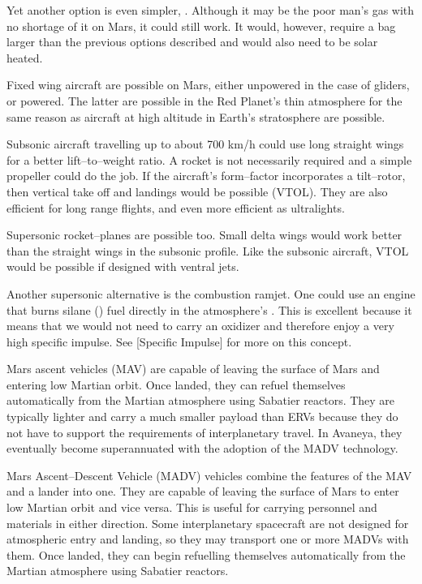 Yet another option is even simpler, . Although it may be the poor man's gas with no shortage of it on Mars, it could still work. It would, however, require a bag larger than the previous options described and would also need to be solar heated.

Fixed wing aircraft are possible on Mars, either unpowered in the case of gliders, or powered. The latter are possible in the Red Planet's thin atmosphere for the same reason as aircraft at high altitude in Earth's stratosphere are possible.

Subsonic aircraft travelling up to about 700 km/h could use long straight wings for a better lift--to--weight ratio. A rocket is not necessarily required and a simple propeller could do the job. If the aircraft's form--factor incorporates a tilt--rotor, then vertical take off and landings would be possible (VTOL). They are also efficient for long range flights, and even more efficient as ultralights.

Supersonic rocket--planes are possible too. Small delta wings would work better than the straight wings in the subsonic profile. Like the subsonic aircraft, VTOL would be possible if designed with ventral jets.

Another supersonic alternative is the combustion ramjet. One could use an engine that burns silane () fuel directly in the atmosphere's . This is excellent because it means that we would not need to carry an oxidizer and therefore enjoy a very high specific impulse. See [Specific Impulse] for more on this concept.

Mars ascent vehicles (MAV) are capable of leaving the surface of Mars and entering low Martian orbit. Once landed, they can refuel themselves automatically from the Martian atmosphere using Sabatier reactors. They are typically lighter and carry a much smaller payload than ERVs because they do not have to support the requirements of interplanetary travel. In Avaneya, they eventually become superannuated with the adoption of the MADV technology.

Mars Ascent--Descent Vehicle (MADV) vehicles combine the features of the MAV and a lander into one. They are capable of leaving the surface of Mars to enter low Martian orbit and vice versa. This is useful for carrying personnel and materials in either direction. Some interplanetary spacecraft are not designed for atmospheric entry and landing, so they may transport one or more MADVs with them. Once landed, they can begin refuelling themselves automatically from the Martian atmosphere using Sabatier reactors.

